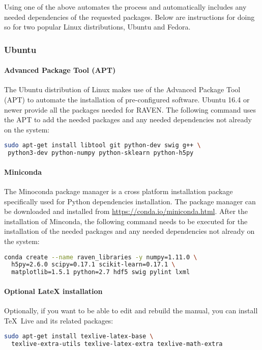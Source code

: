 Using one of the above automates the process and automatically includes any needed
dependencies of the requested packages.  Below are instructions for
doing so for two popular Linux distributions, Ubuntu and Fedora.

\subsubsection{Ubuntu}

\paragraph{Advanced Package Tool (APT)}
The Ubuntu distribution of Linux makes use of the Advanced Package
Tool (APT) to automate the installation of pre-configured software.
Ubuntu 16.4 or newer provide all the packages needed for RAVEN.  The
following command uses the APT to add the needed packages and any
needed dependencies not already on the system:

\begin{lstlisting}[language=bash]
 sudo apt-get install libtool git python-dev swig g++ \
 python3-dev python-numpy python-sklearn python-h5py
\end{lstlisting}


\paragraph{Miniconda}
The Minoconda package manager is a cross platform installation package specifically
used for Python dependencies installation.
The package manager can be downloaded and installed from \url{https://conda.io/miniconda.html}.
After the installation of Minconda, the following command needs to be executed for the installation of
the needed packages and any needed dependencies not already on the system:

\begin{lstlisting}[language=bash]
 conda create --name raven_libraries -y numpy=1.11.0 \
  h5py=2.6.0 scipy=0.17.1 scikit-learn=0.17.1 \
  matplotlib=1.5.1 python=2.7 hdf5 swig pylint lxml
\end{lstlisting}

\paragraph{Optional LateX installation}
Optionally, if you want to be able to edit and rebuild the manual, you can
install \TeX~Live and its related packages:
\begin{lstlisting}[language=bash]
  sudo apt-get install texlive-latex-base \
  texlive-extra-utils texlive-latex-extra texlive-math-extra
\end{lstlisting}


